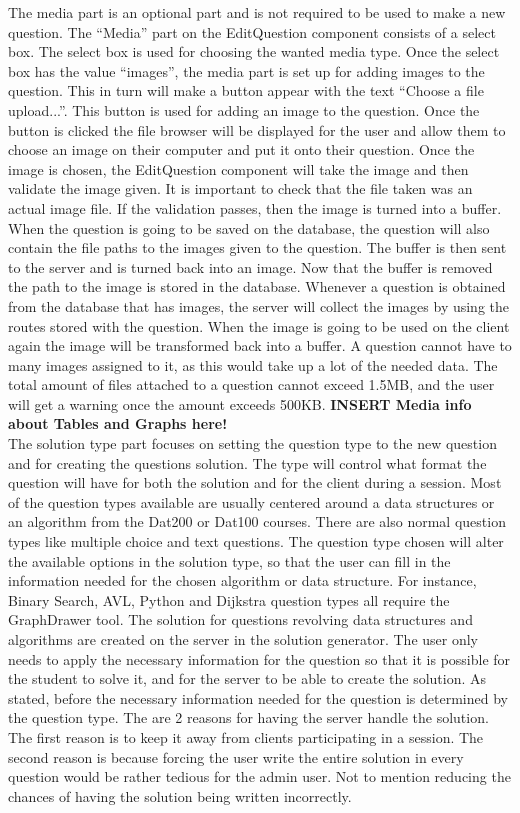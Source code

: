 The media part is an optional part and is not required to be used to make a new question. The “Media” part on the EditQuestion component consists of a select box. The select box is used for choosing the wanted media type. Once the select box has the value “images”, the media part is set up for adding images to the question. This in turn will make a button appear with the text “Choose a file upload...”. This button is used for adding an image to the question. Once the button is clicked the file browser will be displayed for the user and allow them to choose an image on their computer and put it onto their question. Once the image is chosen, the EditQuestion component will take the image and then validate the image given. It is important to check that the file taken was an actual image file. If the validation passes, then the image is turned into a buffer. When the question is going to be saved on the database, the question will also contain the file paths to the images given to the question. The buffer is then sent to the server and is turned back into an image. Now that the buffer is removed the path to the image is stored in the database. Whenever a question is obtained from the database that has images, the server will collect the images by using the routes stored with the question. When the image is going to be used on the client again the image will be transformed back into a buffer. A question cannot have to many images assigned to it, as this would take up a lot of the needed data. The total amount of files attached to a question cannot exceed 1.5MB, and the user will get a warning once the amount exceeds 500KB.
\textbf{INSERT Media info about Tables and Graphs here!}
\\[11pt]
The solution type part focuses on setting the question type to the new question and for creating the questions solution. The type will control what format the question will have for both the solution and for the client during a session. Most of the question types available are usually centered around a data structures or an algorithm from the Dat200 or Dat100 courses. There are also normal question types like multiple choice and text questions. The question type chosen will alter the available options in the solution type, so that the user can fill in the information needed for the chosen algorithm or data structure. For instance, Binary Search, AVL, Python and Dijkstra question types all require the GraphDrawer tool. The solution for questions revolving data structures and algorithms are created on the server in the solution generator. The user only needs to apply the necessary information for the question so that it is possible for the student to solve it, and for the server to be able to create the solution. As stated, before the necessary information needed for the question is determined by the question type. The are 2 reasons for having the server handle the solution. The first reason is to keep it away from clients participating in a session. The second reason is because forcing the user write the entire solution in every question would be rather tedious for the admin user. Not to mention reducing the chances of having the solution being written incorrectly.
